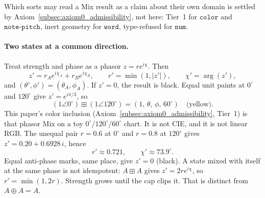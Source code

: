 \documentclass[12pt, a4paper]{article}
\begin{document}
Which sorts may read a Mix result as a claim about their own domain is
settled by Axiom~\ref{subsec:axiom0_admissibility}, not here: Tier~1
for $\mathtt{color}$ and $\mathtt{note\text{-}pitch}$, inert geometry
for $\mathtt{word}$, type-refused for $\mathtt{num}$.

\paragraph{Two states at a common direction.}
Treat strength and phase as a phasor $z=r e^{i\chi}$. Then
\begin{equation}
    z' = r_A e^{i\chi_A} + r_B e^{i\chi_B},
    \qquad
    r' = \min(1,|z'|),
    \qquad
    \chi' = \arg(z'),
    \label{eq:interference_formal}
\end{equation}
and $(\theta',\phi')=(\theta_A,\phi_A)$. If $z'=0$, the result is
black. Equal unit paints at $0^\circ$ and $120^\circ$ give
$z'=e^{i\pi/3}$, so
\[
(1\angle 0^\circ)\boxplus(1\angle 120^\circ)
=(1,\,\theta,\,\phi,\,60^\circ)
\quad\text{(yellow)}.
\]
This paper's color inclusion
(Axiom~\ref{subsec:axiom0_admissibility}, Tier~1) is that phasor Mix
on a toy $0^\circ/120^\circ/60^\circ$ chart. It is not CIE, and it is
not linear RGB.
The unequal pair $r=0.6$ at $0^\circ$ and $r=0.8$ at $120^\circ$
gives $z'=0.20+0.6928\,i$, hence
\[
r'\approx 0.721,\qquad \chi'\approx 73.9^\circ.
\]
Equal anti-phase marks, same place, give $z'=0$ (black).
A state mixed with itself at the same phase is not idempotent:
$A\boxplus A$ gives $z'=2r e^{i\chi}$, so $r'=\min(1,2r)$.
Strength grows until the cap clips it. That is distinct from
$A\oplus A=A$.
\end{document}
